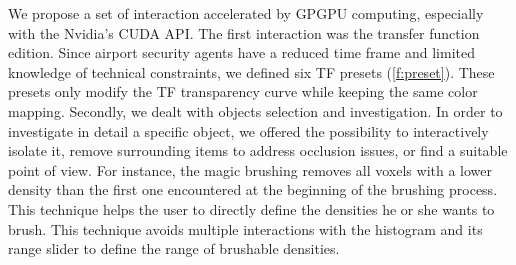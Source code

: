 We propose a set of interaction accelerated by GPGPU computing, especially with the Nvidia's CUDA API. The first interaction was the transfer function edition. Since airport security agents have a reduced time frame and limited knowledge of technical constraints, we defined six TF presets (\autoref{f:preset}). These presets only modify the TF transparency curve while keeping the same color mapping. Secondly, we dealt with objects selection and investigation. In order to investigate in detail a specific object, we offered the possibility to interactively isolate it, remove surrounding items to address occlusion issues, or find a suitable point of view. For instance,
the magic brushing removes all voxels with a lower density than the first one encountered at the beginning of the brushing process. This technique helps the user to directly define the densities he or she wants to brush. This technique avoids multiple interactions with the histogram and its range slider to define the range of brushable densities.


